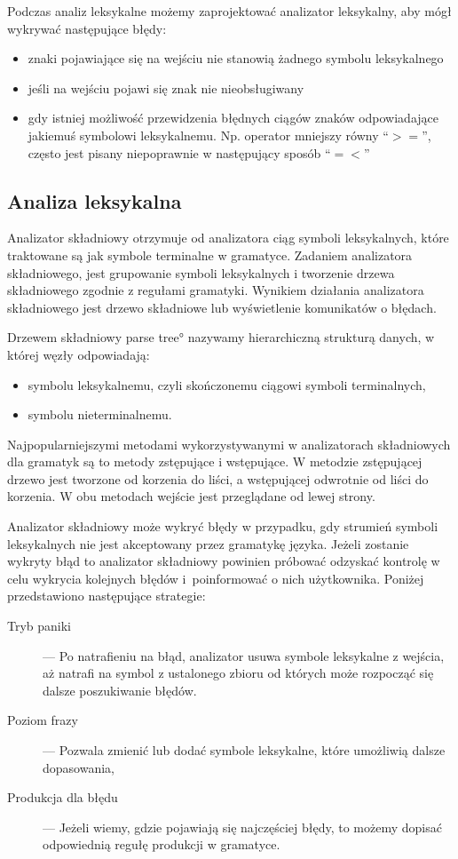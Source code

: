 Podczas analiz leksykalne możemy zaprojektować analizator leksykalny, 
aby mógł wykrywać następujące błędy:
      \begin{itemize}
	\item   znaki pojawiające się na wejściu nie stanowią żadnego symbolu leksykalnego
	\item   jeśli na wejściu pojawi się znak nie nieobsługiwany 
	\item   gdy istniej możliwość przewidzenia błędnych ciągów znaków odpowiadające jakiemuś symbolowi leksykalnemu.
		Np. operator mniejszy równy \textquotedblleft$>=$\textquotedblright, 
		często jest pisany niepoprawnie w następujący sposób \textquotedblleft$=<$\textquotedblright
      \end{itemize}

\subsection{Analiza leksykalna}


Analizator składniowy otrzymuje od analizatora ciąg symboli leksykalnych,
 które traktowane są jak symbole terminalne w gramatyce. Zadaniem analizatora składniowego,
 jest grupowanie symboli leksykalnych i tworzenie drzewa składniowego zgodnie
 z regułami gramatyki. 
Wynikiem działania analizatora składniowego jest drzewo składniowe lub wyświetlenie komunikatów o błędach.

Drzewem składniowy \ang{parse tree} nazywamy hierarchiczną strukturą danych,
 w której węzły odpowiadają:
\begin{itemize}
  \item  
    symbolu leksykalnemu, czyli skończonemu  ciągowi symboli terminalnych,
  \item  
    symbolu nieterminalnemu.
\end{itemize}


Najpopularniejszymi metodami wykorzystywanymi w analizatorach składniowych
 dla gramatyk są to metody zstępujące i wstępujące.
W metodzie zstępującej drzewo jest tworzone od korzenia do liści,
 a wstępującej odwrotnie od liści do korzenia.
W obu metodach wejście jest przeglądane od lewej strony.

Analizator składniowy może wykryć błędy w przypadku,
 gdy strumień symboli leksykalnych nie jest akceptowany przez gramatykę języka.
Jeżeli zostanie wykryty błąd to analizator składniowy powinien próbować odzyskać kontrolę w celu wykrycia kolejnych błędów
 i~poinformować o nich użytkownika.
Poniżej przedstawiono następujące strategie\cite{aho}:
\begin{description}
  \item[Tryb paniki] --- 
     Po natrafieniu na błąd,
      analizator usuwa symbole leksykalne z wejścia, 
      aż natrafi na symbol z ustalonego zbioru od których może rozpocząć się dalsze poszukiwanie błędów.
  \item[Poziom frazy] --- 
     Pozwala zmienić lub dodać symbole leksykalne,
      które umożliwią dalsze dopasowania,
  \item [Produkcja dla błędu] --- 
     Jeżeli wiemy, 
      gdzie pojawiają się najczęściej błędy,
      to możemy dopisać odpowiednią regułę produkcji w gramatyce.
\end{description}

